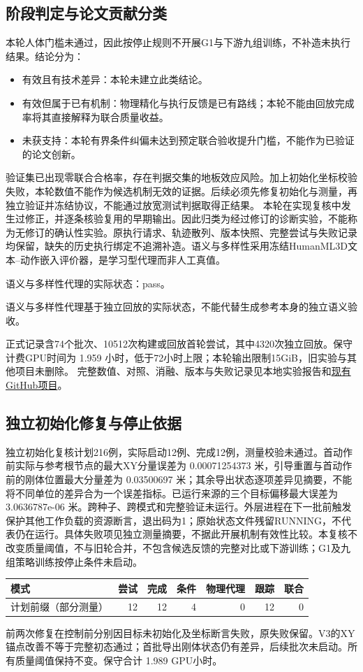 \subsection{阶段判定与论文贡献分类}
本轮人体门槛未通过，因此按停止规则不开展G1与下游九组训练，不补造未执行结果。结论分为：
\begin{itemize}
\item 有效且有技术差异：本轮未建立此类结论。
\item 有效但属于已有机制：物理精化与执行反馈是已有路线；本轮不能由回放完成率将其直接解释为联合质量收益。
\item 未获支持：本轮有界条件纠偏未达到预定联合验收提升门槛，不能作为已验证的论文创新。
\end{itemize}
验证集已出现零联合合格率，存在判据交集的地板效应风险。加上初始化坐标校验失败，本轮数值不能作为候选机制无效的证据。后续必须先修复初始化与测量，再独立验证并冻结协议，不能通过放宽测试判据取得正结果。
本轮在实现复核中发生过修正，并逐条核验复用的早期输出。因此归类为经过修订的诊断实验，不能称为无修订的确认性实验。原执行请求、轨迹散列、版本快照、完整尝试与失败记录均保留，缺失的历史执行绑定不追溯补造。语义与多样性采用冻结HumanML3D文本--动作嵌入评价器，是学习型代理而非人工真值。

语义与多样性代理的实际状态：pass。

语义与多样性代理基于独立回放的实际状态，不能代替生成参考本身的独立语义验收。

正式记录含74个批次、10512次构建或回放首轮尝试，其中4320次独立回放。保守计费GPU时间为 1.959 小时，低于72小时上限；本轮输出限制15GiB，旧实验与其他项目未删除。
完整数值、对照、消融、版本与失败记录见本地实验报告和\href{https://github.com/Pendragon08/conditional-human-motion-generation}{现有GitHub项目}。


\subsection{独立初始化修复与停止依据}
独立初始化复核计划216例，实际启动12例、完成12例，测量校验未通过。首动作前实际与参考根节点的最大XY分量误差为 0.00071254373 米，引导重置与首动作前的刚体位置最大分量差为 0.03500697 米；其余导出状态逐项差异见摘要，不能将不同单位的差异合为一个误差指标。已运行来源的三个目标偏移最大误差为 3.0636787e-06 米。跨种子、跨模式和完整验证未运行。外层进程在下一批前触发保护其他工作负载的资源断言，退出码为1；原始状态文件残留RUNNING，不代表仍在运行。具体失败项见独立测量摘要，不据此开展机制有效性比较。本复核不改变质量阈值，不与旧轮合并，不包含候选反馈的完整对比或下游训练；G1及九组策略训练按停止条件未启动。
\begin{center}\small\begin{tabular}{lrrrrrr}\hline 模式 & 尝试 & 完成 & 条件 & 物理代理 & 跟踪 & 联合 \\ \hline
计划前缀（部分测量） & 12 & 12 & 4 & 0 & 12 & 0 \\
\hline\end{tabular}\end{center}
前两次修复在控制前分别因目标未初始化及坐标断言失败，原失败保留。V3的XY锚点改善不等于完整初态通过；首批导出刚体状态仍有差异，后续批次未启动。所有质量阈值保持不变。保守合计 1.989 GPU小时。
